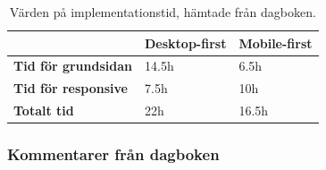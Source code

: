 \documentclass[11pt]{article}
\begin{document}
\begin{table}[H]
	\centering
	\begin{tabular}{|p{6cm}|p{2.7cm}|p{2.4cm}|}
	\hline
	~&\textbf{Desktop-first}&\textbf{Mobile-first}\\ \hline
	\textbf{Tid för grundsidan}&14.5h&6.5h\\ \hline
	\textbf{Tid för responsive}&7.5h&10h\\ \hline
	\textbf{Totalt tid}&22h&16.5h\\ \hline
	\end{tabular}
    \caption {Värden på implementationstid, hämtade från dagboken.}
\end{table}

\subsubsection{Kommentarer från dagboken}
\end{document}
